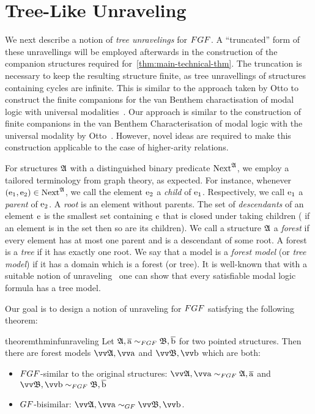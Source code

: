 
\section{Tree-Like Unraveling}\label{sec:unraveling}
We next describe a notion of \emph{tree unravelings} for $\FGF$.
A ``truncated'' form of these unravellings will be employed afterwards in the construction of the companion structures required for~\cref{thm:main-technical-thm}.
The truncation is necessary to keep the resulting structure finite, as tree unravellings of structures containing cycles are infinite.
This is similar to the approach taken by Otto to construct the finite companions for the van Benthem charactisation of modal logic with universal modalities~\cite[Proof of Lemma 38]{Otto04}.
Our approach is similar to the construction of finite companions in the van Benthem Characterisation of modal logic with the universal modality by Otto~\cite[Proof of Lemma 38]{Otto04}.
However, novel ideas are required to make this construction applicable to the case of higher-arity relations.

For structures ${\mathfrak{A}}$ with a distinguished binary predicate $\mathrm{Next}^{{\mathfrak{A}}}$, we employ a tailored terminology from graph theory, as expected.
For instance, whenever $(\mathrm{e}_1, \mathrm{e}_2) \in \mathrm{Next}^{{\mathfrak{A}}}$, we call the element $\mathrm{e}_2$ a \emph{child} of $\mathrm{e}_1$. Respectively, we call $\mathrm{e}_1$ a \emph{parent} of $\mathrm{e}_2$.
A \emph{root} is an element without parents.
The set of \emph{descendants} of an element $\mathrm{e}$ is the smallest set containing $\mathrm{e}$ that is closed under taking children (\ie{} if an element is in the set then so are its children).
We call a structure ${\mathfrak{A}}$ a \emph{forest} if every element has at most one parent and is a descendant of some root.
A forest is a \emph{tree} if it has exactly one root.
We say that a model is a \emph{forest model} (or \emph{tree model}) if it has a domain which is a forest (or tree).
It is well-known that with a suitable notion of unraveling~\cite[Prop. 3]{Rosen97} one can show that every satisfiable modal logic formula has a tree model.

Our goal is to design a notion of unraveling for $\FGF$ satisfying the following theorem:
\begin{restatable}{theorem}{thminfunraveling}\label{thm:inf-unraveling-upgrading}
  Let $\str{A}, \elemtuplea \bisimto_{\FGF} \str{B}, \elemtupleb$ for two pointed structures.
  Then there are forest models $\unravel{A}, \elemtuptuplea$ and $\unravel{B}, \elemtuptupleb$ which are both:
  \begin{itemize}
    \item $\FGF$-similar to the original structures: $\unravel{A}, \elemtuptuplea \bisimto_{\FGF} \str{A}, \elemtuplea$ and $\unravel{B}, \elemtuptupleb \bisimto_{\FGF} \str{B}, \elemtupleb$
    \item $\GF$-bisimilar: $\unravel{A}, \elemtuptuplea \bisimto_{\GF} \unravel{B}, \elemtuptupleb$.
  \end{itemize}
\end{restatable}

